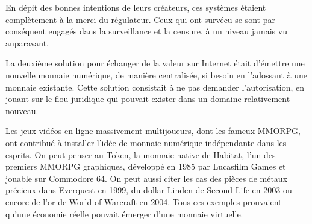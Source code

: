 En dépit des bonnes intentions de leurs créateurs, ces systèmes étaient complètement à la merci du régulateur. Ceux qui ont survécu se sont par conséquent engagés dans la surveillance et la censure, à un niveau jamais vu auparavant.



La deuxième solution pour échanger de la valeur sur Internet était d'émettre une nouvelle monnaie numérique, de manière centralisée, si besoin en l'adossant à une monnaie existante. Cette solution consistait à ne pas demander l'autorisation, en jouant sur le flou juridique qui pouvait exister dans un domaine relativement nouveau.

Les jeux vidéos en ligne massivement multijoueurs, dont les fameux MMORPG, ont contribué à installer l'idée de monnaie numérique indépendante dans les esprits. On peut penser au Token, la monnaie native de Habitat, l'un des premiers MMORPG graphiques, développé en 1985 par Lucasfilm Games et jouable sur Commodore 64. On peut aussi citer les cas des pièces de métaux précieux dans Everquest en 1999, du dollar Linden de Second Life en 2003 ou encore de l'or de World of Warcraft en 2004. Tous ces exemples prouvaient qu'une économie réelle pouvait émerger d'une monnaie virtuelle.

